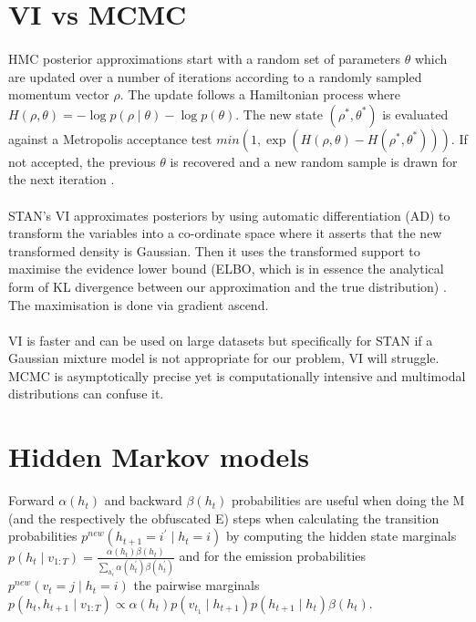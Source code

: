 \documentclass[11pt,a4paper,titlepage]{article}
\begin{document}
\section{VI vs MCMC}
\paragraph{}
HMC posterior approximations start with a random set of parameters \(\theta\) which are updated over a number of iterations according to a randomly sampled momentum vector \(\rho\). The update follows a Hamiltonian process where \(H(\rho,\theta) = -\log p(\rho \mid \theta) - \log p(\theta)\). The new state \((\rho^*,\theta^*)\) is evaluated against a Metropolis acceptance test \(min(1, \exp(H(\rho,\theta)-H(\rho^*,\theta^*)))\). If not accepted, the previous \(\theta\) is recovered and a new random sample is drawn for the next iteration \parencite{betancourt2015hamiltonian}.
\paragraph{}
STAN's VI approximates posteriors by using automatic differentiation (AD) to transform the variables into a co-ordinate space where it asserts that the new transformed density is Gaussian. Then it uses the transformed support to maximise the evidence lower bound (ELBO, which is in essence the analytical form of KL divergence between our approximation and the true distribution) \parencite{ADVISTAN}. The maximisation is done via gradient ascend.
\paragraph{}
VI is faster and can be used on large datasets but specifically for STAN if a Gaussian mixture model is not appropriate for our problem, VI will struggle. MCMC is asymptotically precise yet is computationally intensive and multimodal distributions can confuse it.

\section{Hidden Markov models}
Forward \(\alpha(h_t)\) and backward \(\beta(h_t)\) probabilities are useful when doing the M (and the respectively the obfuscated E) steps when calculating the transition probabilities \(p^{new}(h_{t+1} = i^\prime \mid h_t = i)\) by computing the hidden state marginals \(p(h_t \mid v_{1:T}) = \frac{\alpha(h_t)\beta(h_t)}{\sum_{h^{\prime}_t}\alpha(h_t^\prime)\beta(h_t^\prime)}\) and for the emission probabilities \(p^{new}(v_t = j \mid h_t = i)\) the pairwise marginals \(p(h_t, h_{t+1} \mid v_{1:T}) \propto \alpha(h_t)p(v_{t_1} \mid h_{t+1})p(h_{t+1} \mid h_t)\beta(h_t)\).
\end{document}
